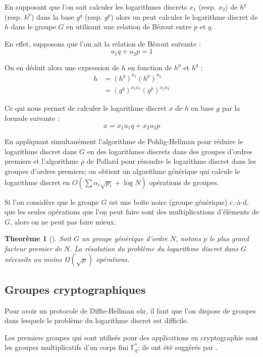 \documentclass[a4paper]{article}
\newtheorem{theoreme}{Theorème}[section]
\theoremstyle{definition}
\theoremstyle{remark}
\numberwithin{equation}{section}
\begin{document}
En supposant que l'on sait calculer les logarithmes discrets $x_1$ (resp. $x_2$) de $h^q$ (resp. $h^p$) dans la base $g^q$ (resp. $g^p$) alors on peut calculer le logarithme discret de $h$ dans le groupe $G$ en utilisant une relation de Bézout entre $p$ et $q$. 

En effet, supposons que l'on ait la relation de Bézout suivante :
$$u_1 q + u_2 p = 1$$

On en déduit alors une expression de $h$ en fonction de $h^p$ et $h^q$ :
\begin{align*}
h &= (h^q)^{u_1}(h^p)^{u_2} \\
  &= (g^q)^{x_1u_1}(g^p)^{x_2u_2}
\end{align*}

Ce qui nous permet de calculer le logarithme discret $x$ de $h$ en base $g$ par la formule suivante :
$$x = x_1 u_1 q + x_2 u_2 p$$

En appliquant simultanément l'algorithme de Pohlig-Hellman pour réduire le logarithme discret dans $G$ en des logarithmes discrets dans des groupes d'ordres premiers et l'algorithme $\rho$ de Pollard pour résoudre le logarithme discret dans les groupes d'ordres premiers; on obtient un algorithme générique qui calcule le logarithme discret en $O(\sum{\alpha_i\sqrt{p_i}}+\log N)$ opérations de groupes.

Si l'on considère que le groupe $G$ est une boîte noire (groupe générique) c.-à-d. que les seules opérations que l'on peut faire sont des multiplications d'éléments de $G$, alors on ne peut pas faire mieux.

\begin{theoreme}[\citet{shoup}]
\label{borneShoup}
Soit $G$ un groupe générique d'ordre $N$, notons $p$ le plus grand facteur premier de $N$. La résolution du problème du logarithme discret dans $G$ nécessite au moins $\Omega(\sqrt{p})$ opérations. 
\end{theoreme}

\subsection{Groupes cryptographiques}
Pour avoir un protocole de Diffie-Hellman sûr, il faut que l'on dispose de groupes dans lesquels le problème du logarithme discret est difficile.

Les premiers groupes qui sont utilisés pour des applications en cryptographie sont les groupes multiplicatifs d'un corps fini $\mathbb{F}^*_q$; ils ont été suggérés par \citet{diffie-hellman}.
\end{document}
